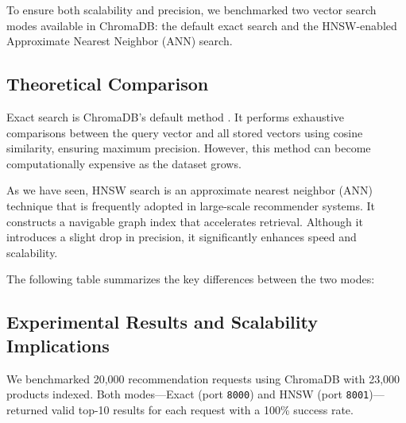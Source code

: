 To ensure both scalability and precision, we benchmarked two vector search modes available in ChromaDB: the default exact search and the HNSW-enabled Approximate Nearest Neighbor (ANN) search.

\subsection{Theoretical Comparison}
\par Exact search is ChromaDB’s default method . It performs exhaustive comparisons between the query vector and all stored vectors using cosine similarity, ensuring maximum precision. However, this method can become computationally expensive as the dataset grows.

\par As we have seen, HNSW search is an approximate nearest neighbor (ANN) technique that is frequently adopted in large-scale recommender systems. It constructs a navigable graph index that accelerates retrieval. Although it introduces a slight drop in precision, it significantly enhances speed and scalability.

\noindent
The following table summarizes the key differences between the two modes:

\begin{table}[h!]
\centering
{}
\caption{Key Differences: Default vs. HNSW Search}
\label{tab:theoretical-comparison}
\end{table}

\subsection{Experimental Results and Scalability Implications}

We benchmarked 20,000 recommendation requests using ChromaDB with 23,000 products indexed. Both modes—Exact (port \texttt{8000}) and HNSW (port \texttt{8001})—returned valid top-10 results for each request with a 100\% success rate.

